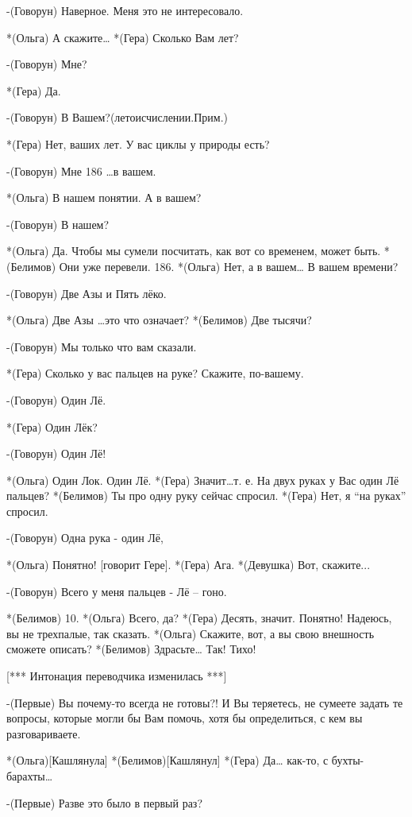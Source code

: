 -(Говорун) Наверное. Меня это не интересовало.

*(Ольга) А скажите…
*(Гера) Сколько Вам лет?

-(Говорун) Мне?

*(Гера) Да.

-(Говорун) В Вашем?(летоисчислении.Прим.)

*(Гера) Нет, ваших лет. У вас циклы у природы есть?

-(Говорун) Мне 186 …в вашем.

*(Ольга) В нашем понятии. А в вашем?

-(Говорун) В нашем?

*(Ольга) Да. Чтобы мы сумели посчитать, как вот со временем, может быть.
*(Белимов) Они уже перевели.  186.
*(Ольга) Нет, а в вашем… В вашем времени?

-(Говорун) Две Азы и Пять лёко.

*(Ольга) Две Азы …это что означает?
*(Белимов) Две тысячи?

-(Говорун) Мы только что вам сказали.

*(Гера) Сколько у вас пальцев на руке? Скажите, по-вашему.

-(Говорун) Один Лё.

*(Гера) Один Лёк?

-(Говорун) Один Лё!

*(Ольга) Один Лок. Один Лё.
*(Гера) Значит…т. е. На двух руках у Вас один Лё пальцев?
*(Белимов) Ты про одну руку сейчас спросил.
*(Гера) Нет, я “на руках” спросил.

-(Говорун) Одна рука - один Лё, 

*(Ольга) Понятно! [говорит Гере].
*(Гера) Ага.
*(Девушка) Вот, скажите...

-(Говорун) Всего у меня пальцев  - Лё – гоно.

*(Белимов) 10.
*(Ольга) Всего, да?
*(Гера) Десять, значит. Понятно! Надеюсь, вы не трехпалые, так сказать.
*(Ольга) Скажите, вот, а вы свою внешность сможете описать?
*(Белимов) Здрасьте… Так! Тихо!

[*** Интонация переводчика изменилась ***]

-(Первые) Вы почему-то всегда не готовы?! И Вы теряетесь, не сумеете задать те вопросы, которые могли бы Вам помочь, хотя бы определиться, с кем вы разговариваете.

*(Ольга)[Кашлянула]
*(Белимов)[Кашлянул]
*(Гера) Да… как-то, с бухты-барахты…

-(Первые) Разве это было в первый раз?

